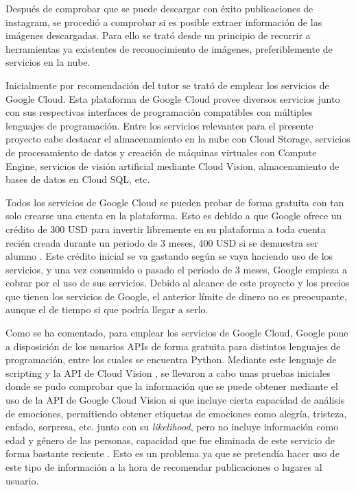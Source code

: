 Después de comprobar que se puede descargar con éxito publicaciones de instagram, se procedió a comprobar si es posible extraer información de las imágenes descargadas. Para ello se trató desde un principio de recurrir a herramientas ya existentes de reconocimiento de imágenes, preferiblemente de servicios en la nube.

Inicialmente por recomendación del tutor se trató de emplear los servicios de Google Cloud. Esta plataforma de Google Cloud provee diversos servicios junto con sus respectivas interfaces de programación compatibles con múltiples lenguajes de programación. Entre los servicios relevantes para el presente proyecto cabe destacar el almacenamiento en la nube con Cloud Storage, servicios de procesamiento de datos y creación de máquinas virtuales con Compute Engine, servicios de visión artificial mediante Cloud Vision, almacenamiento de bases de datos en Cloud SQL, etc.

Todos los servicios de Google Cloud se pueden probar de forma gratuita con tan solo crearse una cuenta en la plataforma. Esto es debido a que Google ofrece un crédito de 300 USD para invertir libremente en su plataforma a toda cuenta recién creada durante un periodo de 3 meses, 400 USD si se demuestra ser alumno \cite{google_cloud}. Este crédito inicial se va gastando según se vaya haciendo uso de los servicios, y una vez consumido o pasado el periodo de 3 meses, Google empieza a cobrar por el uso de sus servicios. Debido al alcance de este proyecto y los precios que tienen los servicios de Google, el anterior límite de dinero no es preocupante, aunque el de tiempo si que podría llegar a serlo.

Como se ha comentado, para emplear los servicios de Google Cloud, Google pone a disposición de los usuarios APIs de forma gratuita para distintos lenguajes de programación, entre los cuales se encuentra Python. Mediante este lenguaje de scripting y la API de Cloud Vision \cite{api_google_vision}, se llevaron a cabo unas pruebas iniciales donde se pudo comprobar que la información que se puede obtener mediante el uso de la API de Google Cloud Vision si que incluye cierta capacidad de análisis de emociones, permitiendo obtener etiquetas de emociones como alegría, tristeza, enfado, sorpresa, etc. junto con su \textit{likelihood}, pero no incluye información como edad y género de las personas, capacidad que fue eliminada de este servicio de forma bastante reciente \cite{archive_google_gender}. Esto es un problema ya que se pretendía hacer uso de este tipo de información a la hora de recomendar publicaciones o lugares al usuario.

